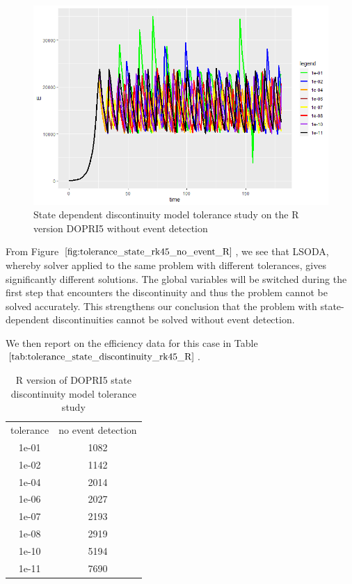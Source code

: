 \begin{figure}[h]
\centering
\includegraphics[width=0.7\linewidth]{./figures/tolerance_state_rk45_no_event_R}
\caption{State dependent discontinuity model tolerance study on the R version DOPRI5 without event detection}
\label{fig:tolerance_state_rk45_no_event_R}
\end{figure}

From Figure $\ref{fig:tolerance_state_rk45_no_event_R}$, we see that LSODA, whereby solver applied to the same problem with different tolerances, gives significantly different solutions. The global variables will be switched during the first step that encounters the discontinuity and thus the problem cannot be solved accurately. This strengthens our conclusion that the problem with state-dependent discontinuities cannot be solved without event detection.

We then report on the efficiency data for this case in Table $\ref{tab:tolerance_state_discontinuity_rk45_R}$. 

\begin{table}[h]
\caption {R version of DOPRI5 state discontinuity model tolerance study} \label{tab:tolerance_state_discontinuity_rk45_R} 
\begin{center}
\begin{tabular}{ c c }
tolerance & no event detection \\
1e-01 & 1082 \\
1e-02 & 1142 \\
1e-04 & 2014 \\
1e-06 & 2027 \\
1e-07 & 2193 \\
1e-08 & 2919 \\
1e-10 & 5194 \\
1e-11 & 7690 \\
\end{tabular}
\end{center}
\end{table}

